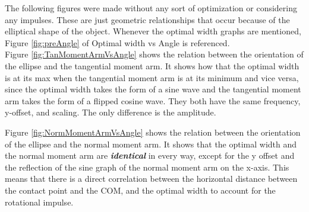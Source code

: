 \documentclass{article}
\begin{document}
\noindent The following figures were made without any sort of optimization or considering any impulses. These are just geometric relationships that occur because of the elliptical shape of the object. Whenever the optimal width graphs are mentioned, Figure \ref{fig:preAngle} of Optimal width vs Angle is referenced. \\

\noindent Figure \ref{fig:TanMomentArmVsAngle} shows the relation between the orientation of the ellipse and the tangential moment arm. It shows how that the optimal width is at its max when the tangential moment arm is at its minimum and vice versa, since the optimal width takes the form of a sine wave and the tangential moment arm takes the form of a flipped cosine wave. They both have the same frequency, y-offset, and scaling. The only difference is the amplitude. 

\noindent Figure \ref{fig:NormMomentArmVsAngle} shows the relation between the orientation of the ellipse and the normal moment arm. It shows that the optimal width and the normal moment arm are \textbf{\textit{identical}} in every way, except for the y offset and the reflection of the sine graph of the normal moment arm on the x-axis. This means that there is a direct correlation between the horizontal distance between the contact point and the COM, and the optimal width to account for the rotational impulse.
\end{document}
